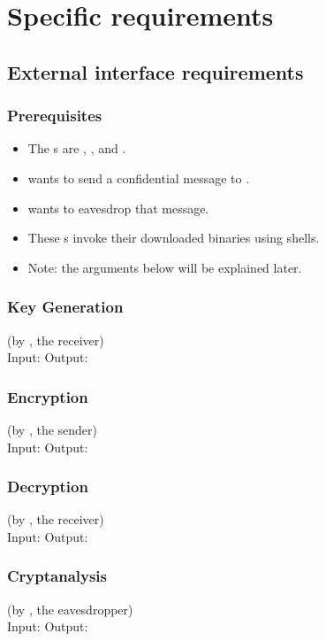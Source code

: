 \section{Specific requirements}
\vp


\subsection{External interface requirements}

\subsubsection{Prerequisites}
\begin{itemize}
\item The \eu s are \alice, \bob, and \eve.
\item \alice{} wants to send a confidential message to \bob.
\item \eve{} wants to eavesdrop that message.
\item These \eu s invoke their downloaded \cry{} binaries
  using \cl{} shells.
\item Note: the \cl{} arguments below will be explained later.
\end{itemize}

\subsubsection{Key Generation}
(by \bob, the receiver) \\ \medskip
Input: \generatekeysin
Output: \generatekeysout

\subsubsection{Encryption}
(by \alice, the sender)  \\ \medskip
Input: \encryptin
Output: \encryptout

\subsubsection{Decryption}
(by \bob, the receiver) \\ \medskip
Input: \decryptin
Output: \decryptout

\subsubsection{Cryptanalysis}
(by \eve, the eavesdropper) \\ \medskip
Input: \cryptanalyzein
Output: \cryptanalyzeout

